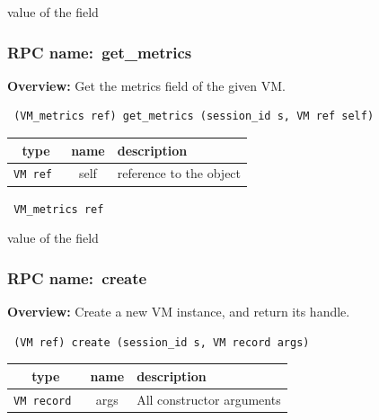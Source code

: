 value of the field
\vspace{0.3cm}
\vspace{0.3cm}
\vspace{0.3cm}
\subsubsection{RPC name:~get\_metrics}

{\bf Overview:} 
Get the metrics field of the given VM.

\begin{verbatim} (VM_metrics ref) get_metrics (session_id s, VM ref self)\end{verbatim}



 
\vspace{0.3cm}
\begin{tabular}{|c|c|p{7cm}|}
 \hline
{\bf type} & {\bf name} & {\bf description} \\ \hline
{\tt VM ref } & self & reference to the object \\ \hline 

\end{tabular}

\vspace{0.3cm}

{\tt 
VM\_metrics ref
}


value of the field
\vspace{0.3cm}
\vspace{0.3cm}
\vspace{0.3cm}
\subsubsection{RPC name:~create}

{\bf Overview:} 
Create a new VM instance, and return its handle.

\begin{verbatim} (VM ref) create (session_id s, VM record args)\end{verbatim}



 
\vspace{0.3cm}
\begin{tabular}{|c|c|p{7cm}|}
 \hline
{\bf type} & {\bf name} & {\bf description} \\ \hline
{\tt VM record } & args & All constructor arguments \\ \hline 

\end{tabular}

